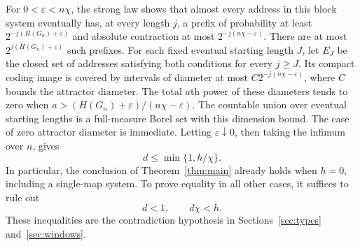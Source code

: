 For $0<\varepsilon<n\chi$, the strong law shows that almost every
address in this block system eventually has, at every length $j$,
a prefix of probability at least $2^{-j(H(G_n)+\varepsilon)}$ and
absolute contraction at most $2^{-j(n\chi-\varepsilon)}$.
There are at most $2^{j(H(G_n)+\varepsilon)}$ such prefixes.
For each fixed eventual starting length $J$, let $E_J$ be the closed
set of addresses satisfying both conditions for every $j\ge J$.
Its compact coding image is covered by intervals of diameter at most
$C2^{-j(n\chi-\varepsilon)}$, where $C$ bounds the attractor diameter.
The total $a$th power of these diameters tends to zero when
$a>(H(G_n)+\varepsilon)/(n\chi-\varepsilon)$.
The countable union over eventual starting lengths is a full-measure
Borel set with this dimension bound.  The case of zero attractor
diameter is immediate.  Letting $\varepsilon\downarrow0$, then taking
the infimum over $n$, gives
\begin{equation}\label{eq:upper-bound}
 d\le\min\{1,h/\chi\}.
\end{equation}
In particular, the conclusion of Theorem~\ref{thm:main} already holds
when $h=0$, including a single-map system.  To prove equality in all
other cases, it suffices to rule out
\begin{equation}\label{eq:dimension-loss}
 d<1,\qquad d\chi<h.
\end{equation}
These inequalities are the contradiction hypothesis in
Sections~\ref{sec:types} and~\ref{sec:windows}.
